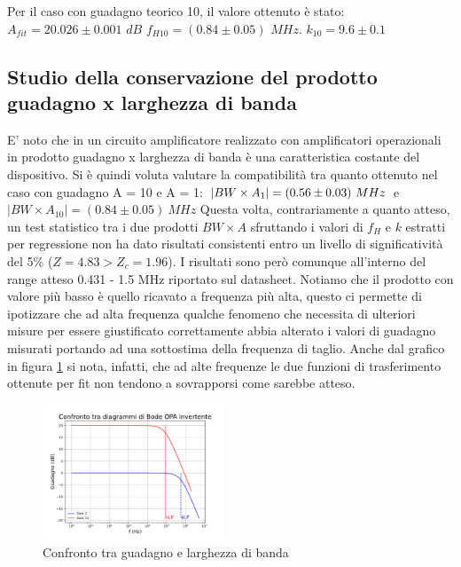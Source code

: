 \documentclass[journal]{IEEEtran}
\begin{document}

Per il caso con guadagno teorico 10, il valore ottenuto è stato:
$A_{fit} = 20.026 \pm 0.001$ $dB$
$f_{H10} = (0.84 \pm 0.05)$ $MHz$.
$k_{10} = 9.6 \pm 0.1$

\subsection{\textbf{Studio della conservazione del prodotto guadagno x larghezza di banda}}

E' noto che in un circuito amplificatore realizzato con amplificatori operazionali in prodotto guadagno x larghezza di banda è una caratteristica costante del dispositivo. Si è quindi voluta valutare la compatibilità tra quanto ottenuto nel caso con guadagno A = 10 e A = 1: $\\ | BW \times A_1 | = (0.56 \pm 0.03)\ MHz \\$  e  $ | BW \times A_{10} | = (0.84 \pm 0.05)\ MHz$
Questa volta, contrariamente a quanto atteso, un test statistico tra i due prodotti $BW \times A$ sfruttando i valori di $f_H$ e $k$ estratti per regressione non ha dato risultati consistenti entro un livello di significatività del 5\% ($Z = 4.83 > Z_c = 1.96$). I risultati sono però comunque all'interno del range atteso 0.431 - 1.5 MHz riportato sul datasheet. Notiamo che il prodotto con valore più basso è quello ricavato a frequenza più alta, questo ci permette di ipotizzare che ad alta frequenza qualche fenomeno che necessita di ulteriori misure per essere giustificato correttamente abbia alterato i valori di guadagno misurati portando ad una sottostima della frequenza di taglio.
Anche dal grafico in figura \ref{fig:OPA-bode_gain_comparison(mag)} si nota, infatti, che ad alte frequenze le due funzioni di trasferimento ottenute per fit non tendono a sovrapporsi come sarebbe atteso.


\begin{figure}[H]%
\begin {center}
\includegraphics[width=0.48\textwidth]{analysis/output/OPA-bode_gain_comparison(mag).pdf}
\caption{Confronto tra guadagno e larghezza di banda}
\label{fig:OPA-bode_gain_comparison(mag)}
\end {center}
\end{figure}
\end{document}

